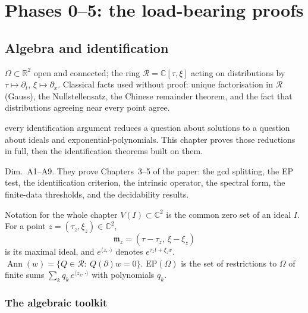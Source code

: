 \documentclass[11pt,a4paper,oneside]{report}
\newcommand{\chapterbrief}[3]{\begin{leadin}\begin{description}[itemsep=3pt,leftmargin=3.1cm,labelwidth=2.9cm,font=\sffamily\bfseries\small]
  \item[Starting from] #1
  \item[Why] #2
  \item[Role] #3
  \end{description}\end{leadin}}
\newcommand{\R}{\mathbb{R}}\newcommand{\C}{\mathbb{C}}\newcommand{\N}{\mathbb{N}}\newcommand{\Z}{\mathbb{Z}}\newcommand{\Q}{\mathbb{Q}}
\newcommand{\Ann}{\operatorname{Ann}}
\newcommand{\EP}{\mathrm{EP}}
\newcommand{\ring}{\mathcal{R}}
\newcommand{\Var}{V}
\begin{document}

\tableofcontents
\clearpage
{}

\part{Phases 0--5: the load-bearing proofs}

\chapter{Algebra and identification}\label{ch:cI1}
\chapterbrief
{$\Omega\subset\R^2$ open and connected; the ring $\ring=\C[\tau,\xi]$ acting on distributions by $\tau\mapsto\partial_t$, $\xi\mapsto\partial_x$. Classical facts used without proof: unique factorisation in $\ring$ (Gauss), the Nullstellensatz, the Chinese remainder theorem, and the fact that distributions agreeing near every point agree.}
{every identification argument reduces a question about solutions to a question about ideals and exponential-polynomials. This chapter proves those reductions in full, then the identification theorems built on them.}
{Dim.~A1--A9. They prove Chapters~3--5 of the paper: the gcd splitting, the EP test, the identification criterion, the intrinsic operator, the spectral form, the finite-data thresholds, and the decidability results.}

\begin{notebox}{Notation for the whole chapter}
$\Var(I)\subset\C^2$ is the common zero set of an ideal $I$. For a point $z=(\tau_z,\xi_z)\in\C^2$,
\[
\mathfrak m_z=(\tau-\tau_z,\ \xi-\xi_z)
\]
is its maximal ideal, and $e^{\langle z,\cdot\rangle}$ denotes $e^{\tau_zt+\xi_zx}$. $\Ann(w)=\{Q\in\ring:\ Q(\partial)w=0\}$. $\EP(\Omega)$ is the set of restrictions to $\Omega$ of finite sums $\sum_kq_k\,e^{\langle z_k,\cdot\rangle}$ with polynomials $q_k$.
\end{notebox}

\section{The algebraic toolkit}
\end{document}
